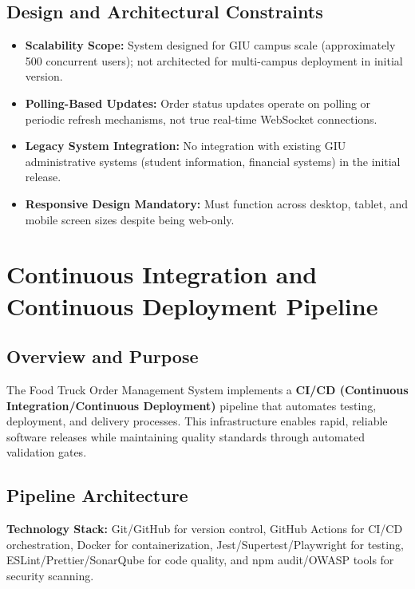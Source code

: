 \documentclass[12pt,a4paper]{article}
\begin{document}
\subsection{Design and Architectural Constraints}
\begin{itemize}[leftmargin=2em, itemsep=8pt]
    \item \textbf{Scalability Scope:} System designed for GIU campus scale (approximately 500 concurrent users); not architected for multi-campus deployment in initial version.
    \item \textbf{Polling-Based Updates:} Order status updates operate on polling or periodic refresh mechanisms, not true real-time WebSocket connections.
    \item \textbf{Legacy System Integration:} No integration with existing GIU administrative systems (student information, financial systems) in the initial release.
    \item \textbf{Responsive Design Mandatory:} Must function across desktop, tablet, and mobile screen sizes despite being web-only.
\end{itemize}

\newpage

\section{Continuous Integration and Continuous Deployment Pipeline}

\subsection{Overview and Purpose}

The Food Truck Order Management System implements a \textbf{CI/CD (Continuous Integration/Continuous Deployment)} pipeline that automates testing, deployment, and delivery processes. This infrastructure enables rapid, reliable software releases while maintaining quality standards through automated validation gates.



\subsection{Pipeline Architecture}

\textbf{Technology Stack:} Git/GitHub for version control, GitHub Actions for CI/CD orchestration, Docker for containerization, Jest/Supertest/Playwright for testing, ESLint/Prettier/SonarQube for code quality, and npm audit/OWASP tools for security scanning.
\end{document}
